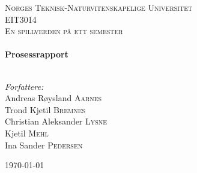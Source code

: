 
\begin{titlepage}

\begin{center}
 

\textsc{\LARGE Norges Teknisk-Naturvitenskapelige Universitet}\\[1.5cm]

 
\textsc{\Large EIT3014}\\[0.5cm]

\textsc{\large En spillverden på ett semester}\\[0.5cm]
 
 
\HRule \\[0.4cm]
{ \huge \bfseries Prosessrapport}\\[0.4cm]
 
\HRule \\[1.5cm]
 

\begin{center} \Large
\emph{Forfattere:}\\
Andreas Røysland \textsc{Aarnes}\\
Trond Kjetil \textsc{Bremnes}\\
Christian Aleksander \textsc{Lysne}\\
Kjetil \textsc{Mehl}\\
Ina Sander \textsc{Pedersen}\\ [3cm]
\end{center}
 

{\large \today}\\[4cm] %
 
\vfill
\end{center}

\end{titlepage}
